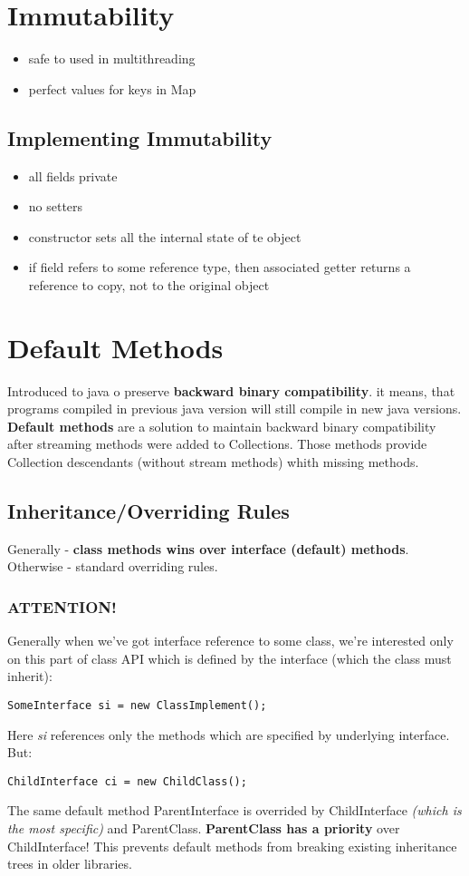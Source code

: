 \documentclass{report}
\begin{document}
\section{Immutability}
\begin{itemize}
	\item safe to used in multithreading
	\item perfect values for keys in Map
\end{itemize}

\subsection{Implementing Immutability}
\begin{itemize}
	\item all fields private
	\item no setters
	\item constructor sets all the internal state of te object
	\item if field refers to some reference type, then associated  getter returns a reference to copy, not to the original object
\end{itemize}

\section{Default Methods}
Introduced to java o preserve \textbf{backward binary compatibility}. it means, that programs compiled in previous java version will still compile in new java versions. \textbf{Default methods} are a solution to maintain backward binary compatibility after streaming methods were added to Collections. Those methods provide Collection descendants (without stream methods) whith missing methods.
\subsection*{Inheritance/Overriding Rules}
Generally - \textbf{class methods wins over interface (default) methods}. Otherwise - standard overriding rules.
\subsubsection*{\textbf{ATTENTION!}}
Generally when we've got interface reference to some class, we're interested only on this part of class API which is defined by the interface (which the class must inherit):
\begin{verbatim}
SomeInterface si = new ClassImplement();
\end{verbatim}
Here \textit{si} references only the methods which are specified by underlying interface.
But:
\begin{verbatim}
ChildInterface ci = new ChildClass();
\end{verbatim}
The same default method ParentInterface is overrided by ChildInterface \textit{(which is the most specific)} and ParentClass. \textbf{ParentClass has a priority} over ChildInterface! This prevents default methods from breaking existing inheritance trees in older libraries.
\end{document}
